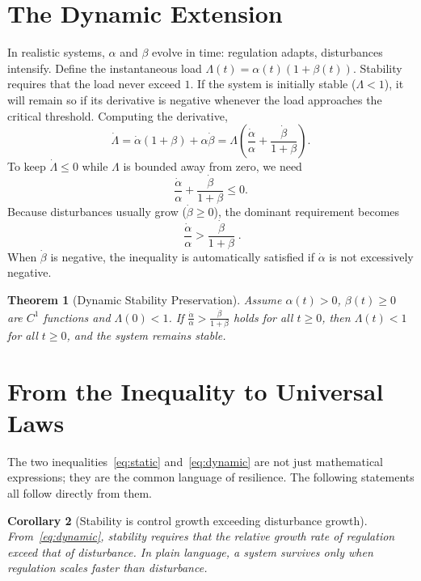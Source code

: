 \documentclass[11pt]{article}
\newtheorem{theorem}{Theorem}[section]
\newtheorem{corollary}[theorem]{Corollary}
\begin{document}
\section{The Dynamic Extension}
In realistic systems, $\alpha$ and $\beta$ evolve in time: regulation adapts, disturbances intensify.  Define the instantaneous load $\Lambda(t) = \alpha(t)(1+\beta(t))$.  Stability requires that the load never exceed $1$.  If the system is initially stable ($\Lambda < 1$), it will remain so if its derivative is negative whenever the load approaches the critical threshold.  Computing the derivative,
\[
\dot\Lambda = \dot\alpha(1+\beta) + \alpha\dot\beta
            = \Lambda\left(\frac{\dot\alpha}{\alpha} + \frac{\dot\beta}{1+\beta}\right).
\]
To keep $\dot\Lambda \le 0$ while $\Lambda$ is bounded away from zero, we need
\[
\frac{\dot\alpha}{\alpha} + \frac{\dot\beta}{1+\beta} \le 0.
\]
Because disturbances usually grow ($\dot\beta \ge 0$), the dominant requirement becomes
\begin{equation}\label{eq:dynamic}
\boxed{\;\frac{\dot\alpha}{\alpha} > \frac{\dot\beta}{1+\beta}\;}.
\end{equation}
When $\dot\beta$ is negative, the inequality is automatically satisfied if $\dot\alpha$ is not excessively negative.

\begin{theorem}[Dynamic Stability Preservation]\label{thm:dynamic}
Assume $\alpha(t)>0$, $\beta(t)\ge0$ are $C^1$ functions and $\Lambda(0)<1$.  If $\frac{\dot\alpha}{\alpha} > \frac{\dot\beta}{1+\beta}$ holds for all $t\ge0$, then $\Lambda(t)<1$ for all $t\ge0$, and the system remains stable.
\end{theorem}

\section{From the Inequality to Universal Laws}
The two inequalities~\eqref{eq:static} and~\eqref{eq:dynamic} are not just mathematical expressions; they are the common language of resilience.  The following statements all follow directly from them.

\begin{corollary}[Stability is control growth exceeding disturbance growth]
\label{cor:growth}
From~\eqref{eq:dynamic}, stability requires that the relative growth rate of regulation exceed that of disturbance.  In plain language, \emph{a system survives only when regulation scales faster than disturbance}.
\end{corollary}
\end{document}
